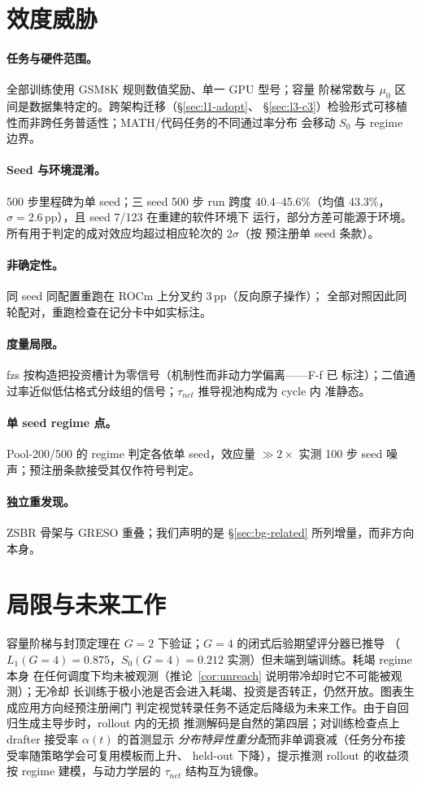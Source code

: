 \documentclass[11pt]{article}
\theoremstyle{definition}
\begin{document}
\section{效度威胁}\label{sec:threats}
\paragraph{任务与硬件范围。}全部训练使用 GSM8K 规则数值奖励、单一 GPU 型号；容量
阶梯常数与 $\mu_0$ 区间是数据集特定的。跨架构迁移（\S\ref{sec:l1-adopt}、
\S\ref{sec:l3-c3}）检验形式可移植性而非跨任务普适性；MATH/代码任务的不同通过率分布
会移动 $S_0$ 与 regime 边界。
\paragraph{Seed 与环境混淆。}500 步里程碑为单 seed；三 seed 500 步 run 跨度
40.4--45.6\%（均值 43.3\%，$\sigma{=}2.6$\,pp），且 seed 7/123 在重建的软件环境下
运行，部分方差可能源于环境。所有用于判定的成对效应均超过相应轮次的 $2\sigma$（按
预注册单 seed 条款）。
\paragraph{非确定性。}同 seed 同配置重跑在 ROCm 上分叉约 3\,pp（反向原子操作）；
全部对照因此同轮配对，重跑检查在记分卡中如实标注。
\paragraph{度量局限。}fzs 按构造把投资槽计为零信号（机制性而非动力学偏离——F-f 已
标注）；二值通过率近似低估格式分歧组的信号；$\tau_{net}$ 推导视池构成为 cycle 内
准静态。
\paragraph{单 seed regime 点。}Pool-200/500 的 regime 判定各依单 seed，效应量
$\gg2\times$ 实测 100 步 seed 噪声；预注册条款接受其仅作符号判定。
\paragraph{独立重发现。}ZSBR 骨架与 GRESO 重叠；我们声明的是
\S\ref{sec:bg-related} 所列增量，而非方向本身。

\section{局限与未来工作}\label{sec:limits}
容量阶梯与封顶定理在 $G{=}2$ 下验证；$G{=}4$ 的闭式后验期望评分器已推导
（$L_1(G{=}4){=}0.875$，$S_0(G{=}4){=}0.212$ 实测）但未端到端训练。耗竭 regime 本身
在任何调度下均未被观测（推论~\ref{cor:unreach} 说明带冷却时它不可能被观测）；无冷却
长训练于极小池是否会进入耗竭、投资是否转正，仍然开放。图表生成应用方向经预注册闸门
判定视觉转录任务不适定后降级为未来工作。由于自回归生成主导步时，rollout 内的无损
推测解码是自然的第四层；对训练检查点上 drafter 接受率 $\alpha(t)$ 的首测显示
\emph{分布特异性重分配}而非单调衰减（任务分布接受率随策略学会可复用模板而上升、
held-out 下降），提示推测 rollout 的收益须按 regime 建模，与动力学层的 $\tau_{net}$
结构互为镜像。
\end{document}
